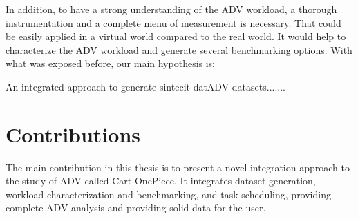 In addition, to have a strong understanding of the ADV workload, a thorough instrumentation and a complete menu of measurement is necessary. That could be easily applied in a virtual world compared to the real world. It would help to characterize the ADV workload and generate several benchmarking options. With what was exposed before, our main hypothesis is:

An integrated approach to generate sintecit datADV datasets.......








\section{Contributions} \label{contrib_projeto}
The main contribution in this thesis is to present a novel integration approach to the study of ADV called Cart-OnePiece. It integrates dataset generation, workload characterization and benchmarking, and task scheduling, providing complete ADV analysis and providing solid data for the user. 

